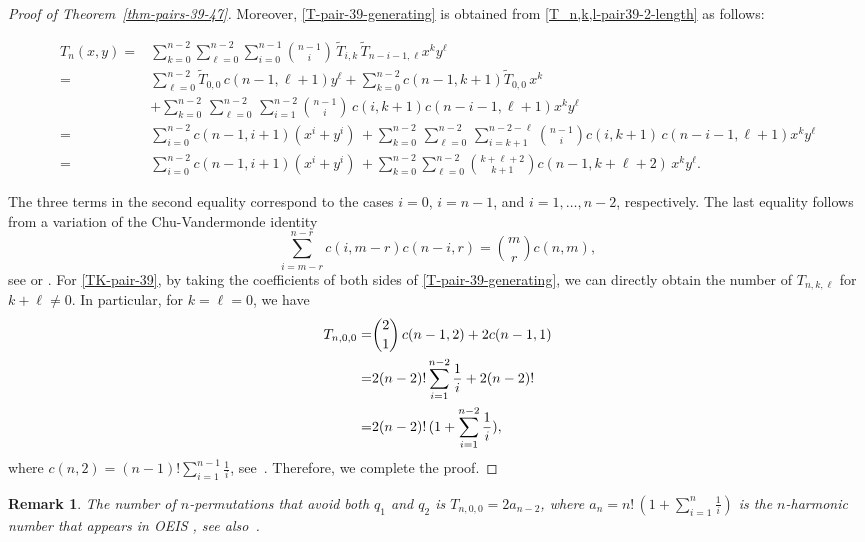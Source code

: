 \documentclass[12pt]{article}
\newtheorem*{remark}{Remark}
\begin{document}
\begin{proof}[Proof of Theorem~\ref{thm-pairs-39-47}]
 Moreover, \eqref{T-pair-39-generating} is obtained from \eqref{T_n,k,l-pair39-2-length} as follows:
 \begin{small}
\begin{align*}
T_n(x,y)=&\sum_{k=0}^{n-2}\sum_{\ell=0}^{n-2} \sum_{i=0}^{n-1} \binom{n-1}{i}\, \widetilde{T}_{i,k}\,\widetilde{T}_{n-i-1,\ell}x^ky^\ell\\
=&\sum_{\ell=0}^{n-2} \widetilde{T}_{0,0}\,c(n-1,\ell+1)y^\ell+ \sum_{k=0}^{n-2} c(n-1,k+1) \widetilde{T}_{0,0}\,x^k   \\
&+\sum_{k=0}^{n-2}\,\sum_{\ell=0}^{n-2}\, \sum_{i=1}^{n-2} \binom{n-1}{i}\, c(i,k+1)c(n-i-1,\ell+1)x^ky^\ell\\
=& \sum_{i=0}^{n-2} c(n-1,i+1)(x^i+y^i) \, + \sum_{k=0}^{n-2}\,\sum_{\ell=0}^{n-2}\, \sum_{i=k+1}^{n-2-\ell} \binom{n-1}{i}c(i,k+1)\,c(n-i-1,\ell+1)x^ky^\ell\\
=&\sum_{i=0}^{n-2} c(n-1,i+1)(x^i+y^i) \, + \sum_{k=0}^{n-2} \sum_{\ell=0}^{n-2}\binom{k+\ell+2}{k+1} c(n-1,k+\ell+2) \, x^k y^\ell.
\end{align*}
\end{small}
\noindent
The three terms in the second equality correspond to the cases $i=0$, $i=n-1$, and $i= 1,\ldots,n-2$, respectively. The last equality follows from a variation of the Chu-Vandermonde identity $$\sum_{i=m-r}^{n-r}c(i,m-r)c(n-i,r) = \binom{m}{r} c(n,m),$$ see \cite{AM-S} or \cite[Equation (17)]{mathworld}. 
For \eqref{TK-pair-39}, by taking the coefficients of both sides of \eqref{T-pair-39-generating}, we can directly obtain the number of $T_{n,k,\ell}$ for $k+\ell \neq 0$. In particular, for $k=\ell=0$, we have 
     \begin{align}\label{eq-har}
        T_{n,0,0}=& \binom{2}{1}\,c(n-1,2)+2c(n-1,1) \notag \\
        =& 2(n-2)!\sum_{i=1}^{n-2}\frac{1}{i}+2(n-2)! \notag \\
        =& 2(n-2)!\,(1+\sum_{i=1}^{n-2}\frac{1}{i}),
    \end{align}
where $c(n,2)=(n-1)!\sum_{i=1}^{n-1}\frac{1}{i}$, see~\cite[Exercise 1.43]{Stanley2012}.
Therefore, we complete the proof.
\end{proof}

\begin{remark}
The number of $n$-permutations that avoid both $q_1$ and $q_2$ is  $T_{n,0,0}=2a_{n-2}$, where $a_n =n!\,(1+\sum_{i=1}^{n}\frac{1}{i})$ is the $n$-harmonic number that appears in OEIS \cite[A000774]{OEIS}, see also~\cite{KR}.
\end{remark}
\end{document}
